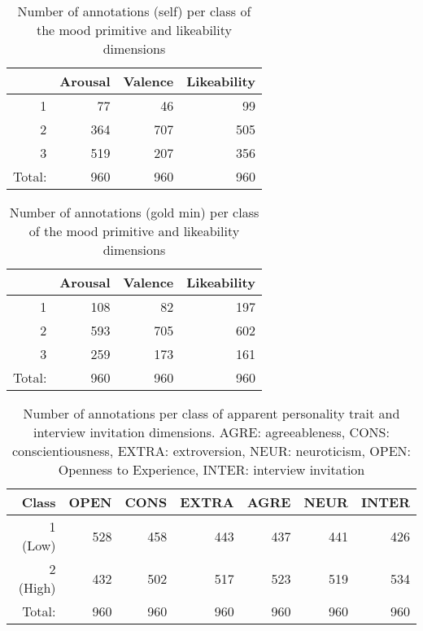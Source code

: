 \begin{table}[h]
\begin{tabular}{|r|r|r|r|}
\hline
\rowcolor{Gray} 
\multicolumn{1}{|l|}{\cellcolor[HTML]{C0C0C0}Class} &
  \multicolumn{1}{l|}{\cellcolor[HTML]{C0C0C0}Arousal} &
  \multicolumn{1}{l|}{\cellcolor[HTML]{C0C0C0}Valence} &
  \multicolumn{1}{l|}{\cellcolor[HTML]{C0C0C0}Likeability} \\ \hline
1                           & 77  & 46  & 99  \\ \hline
2                           & 364 & 707 & 505 \\ \hline
3                           & 519 & 207 & 356 \\ \hline
\multicolumn{1}{|l|}{Total:} & 960 & 960 & 960 \\ \hline
\end{tabular}
\caption{Number of annotations (self) per class of the mood primitive and likeability dimensions}
\label{tab:selfcount}
\end{table}

\begin{table}[h]
\begin{tabular}{|r|r|r|r|}
\hline
\rowcolor{Gray} 
\multicolumn{1}{|l|}{\cellcolor[HTML]{C0C0C0}Class} &
  \multicolumn{1}{l|}{\cellcolor[HTML]{C0C0C0}Arousal} &
  \multicolumn{1}{l|}{\cellcolor[HTML]{C0C0C0}Valence} &
  \multicolumn{1}{l|}{\cellcolor[HTML]{C0C0C0}Likeability} \\ \hline
1                           & 108 & 82  & 197 \\ \hline
2                           & 593 & 705 & 602 \\ \hline
3                           & 259 & 173 & 161 \\ \hline
\multicolumn{1}{|l|}{Total:} & 960 & 960 & 960 \\ \hline
\end{tabular}
\caption{Number of annotations (gold min) per class of the mood primitive and likeability dimensions}
\label{tab:goldcount}
\end{table}

\begin{table*}[h]
\begin{tabular}{|r|r|r|r|r|r|r|}
\hline
\rowcolor{Gray} Class &
  \multicolumn{1}{l|}{OPEN} & 
  \multicolumn{1}{l|}{CONS} &
  \multicolumn{1}{l|}{EXTRA} &
  \multicolumn{1}{l|}{AGRE} &
  \multicolumn{1}{l|}{NEUR} &
  \multicolumn{1}{l|}{INTER} \\ \hline
1 (Low)    & 528 & 458 & 443 & 437 & 441 & 426 \\ \hline
2 (High)    & 432 & 502 & 517 & 523 & 519 & 534 \\ \hline
Total: & 960 & 960 & 960 & 960 & 960 & 960 \\ \hline
\end{tabular}
\caption{Number of annotations per class of apparent personality trait and interview invitation dimensions. AGRE: agreeableness, CONS: conscientiousness, EXTRA: extroversion, NEUR: neuroticism, OPEN: Openness to Experience, INTER: interview invitation}
\label{tab:personcount}
\end{table*}

